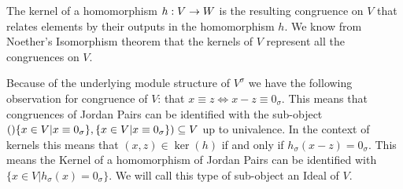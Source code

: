 The kernel of a homomorphism $h:V\rightarrow W$ is the resulting congruence on $V$ that relates elements by their outputs in the
homomorphism $h$. We know from Noether's Isomorphism theorem that the kernels of $V$ represent all the congruences on $V$.


Because of the underlying module structure of $V^\sigma$ we have the following observation for 
congruence of $V$: that $x\equiv z \Leftrightarrow x-z\equiv 0_\sigma$. 
This means that congruences of Jordan Pairs can be identified with the sub-object 
$()\{x\in V | x\equiv 0_\sigma\},\{x\in V | x\equiv 0_\sigma\})\subseteq V$ up to univalence. 
In the context of kernels this means that
$(x,z)\in\ker(h)$ if and only if $h_\sigma(x-z)=0_\sigma$.
This means the Kernel of a homomorphism of Jordan Pairs can be identified with 
$\{x\in V | h_\sigma(x)=0_\sigma\}$.
We will call this type of sub-object an Ideal of $V$.

